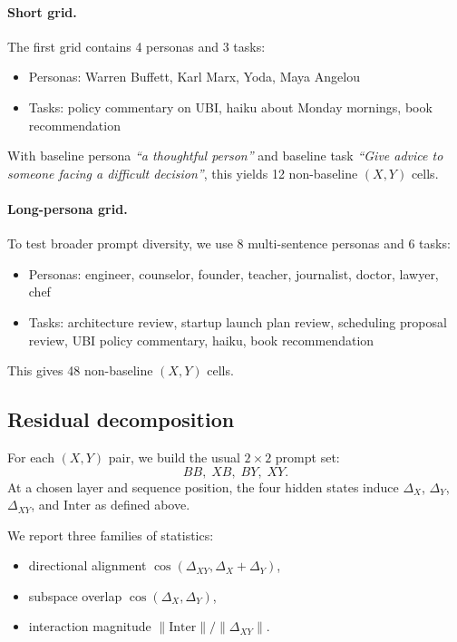 \documentclass[11pt]{article}
\begin{document}
\paragraph{Short grid.}
The first grid contains 4 personas and 3 tasks:
\begin{itemize}
    \item Personas: Warren Buffett, Karl Marx, Yoda, Maya Angelou
    \item Tasks: policy commentary on UBI, haiku about Monday mornings, book recommendation
\end{itemize}
With baseline persona \emph{``a thoughtful person''} and baseline task \emph{``Give advice to someone facing a difficult decision''}, this yields 12 non-baseline $(X,Y)$ cells.

\paragraph{Long-persona grid.}
To test broader prompt diversity, we use 8 multi-sentence personas and 6 tasks:
\begin{itemize}
    \item Personas: engineer, counselor, founder, teacher, journalist, doctor, lawyer, chef
    \item Tasks: architecture review, startup launch plan review, scheduling proposal review, UBI policy commentary, haiku, book recommendation
\end{itemize}
This gives 48 non-baseline $(X,Y)$ cells.

\subsection{Residual decomposition}

For each $(X,Y)$ pair, we build the usual $2\times2$ prompt set:
\[
BB,\; XB,\; BY,\; XY.
\]
At a chosen layer and sequence position, the four hidden states induce $\Delta_X$, $\Delta_Y$, $\Delta_{XY}$, and $\mathrm{Inter}$ as defined above.

We report three families of statistics:
\begin{itemize}
    \item directional alignment $\cos(\Delta_{XY}, \Delta_X + \Delta_Y)$,
    \item subspace overlap $\cos(\Delta_X, \Delta_Y)$,
    \item interaction magnitude $\lVert \mathrm{Inter} \rVert / \lVert \Delta_{XY} \rVert$.
\end{itemize}
\end{document}
